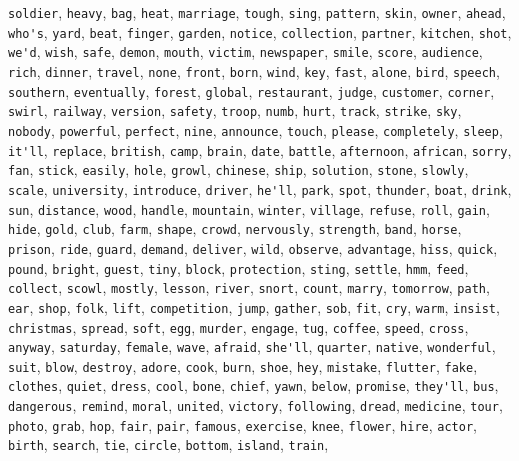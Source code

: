 \verb|soldier|, \verb|heavy|, \verb|bag|, \verb|heat|, \verb|marriage|, \verb|tough|, \verb|sing|, \verb|pattern|, \verb|skin|, \verb|owner|, \verb|ahead|, \verb|who's|, \verb|yard|, \verb|beat|, \verb|finger|, \verb|garden|, \verb|notice|, \verb|collection|, \verb|partner|, \verb|kitchen|, \verb|shot|, \verb|we'd|, \verb|wish|, \verb|safe|, \verb|demon|, \verb|mouth|, \verb|victim|, \verb|newspaper|, \verb|smile|, \verb|score|, \verb|audience|, \verb|rich|, \verb|dinner|, \verb|travel|, \verb|none|, \verb|front|, \verb|born|, \verb|wind|, \verb|key|, \verb|fast|, \verb|alone|, \verb|bird|, \verb|speech|, \verb|southern|, \verb|eventually|, \verb|forest|, \verb|global|, \verb|restaurant|, \verb|judge|, \verb|customer|, \verb|corner|, \verb|swirl|, \verb|railway|, \verb|version|, \verb|safety|, \verb|troop|, \verb|numb|, \verb|hurt|, \verb|track|, \verb|strike|, \verb|sky|, \verb|nobody|, \verb|powerful|, \verb|perfect|, \verb|nine|, \verb|announce|, \verb|touch|, \verb|please|, \verb|completely|, \verb|sleep|, \verb|it'll|, \verb|replace|, \verb|british|, \verb|camp|, \verb|brain|, \verb|date|, \verb|battle|, \verb|afternoon|, \verb|african|, \verb|sorry|, \verb|fan|, \verb|stick|, \verb|easily|, \verb|hole|, \verb|growl|, \verb|chinese|, \verb|ship|, \verb|solution|, \verb|stone|, \verb|slowly|, \verb|scale|, \verb|university|, \verb|introduce|, \verb|driver|, \verb|he'll|, \verb|park|, \verb|spot|, \verb|thunder|, \verb|boat|, \verb|drink|, \verb|sun|, \verb|distance|, \verb|wood|, \verb|handle|, \verb|mountain|, \verb|winter|, \verb|village|, \verb|refuse|, \verb|roll|, \verb|gain|, \verb|hide|, \verb|gold|, \verb|club|, \verb|farm|, \verb|shape|, \verb|crowd|, \verb|nervously|, \verb|strength|, \verb|band|, \verb|horse|, \verb|prison|, \verb|ride|, \verb|guard|, \verb|demand|, \verb|deliver|, \verb|wild|, \verb|observe|, \verb|advantage|, \verb|hiss|, \verb|quick|, \verb|pound|, \verb|bright|, \verb|guest|, \verb|tiny|, \verb|block|, \verb|protection|, \verb|sting|, \verb|settle|, \verb|hmm|, \verb|feed|, \verb|collect|, \verb|scowl|, \verb|mostly|, \verb|lesson|, \verb|river|, \verb|snort|, \verb|count|, \verb|marry|, \verb|tomorrow|, \verb|path|, \verb|ear|, \verb|shop|, \verb|folk|, \verb|lift|, \verb|competition|, \verb|jump|, \verb|gather|, \verb|sob|, \verb|fit|, \verb|cry|, \verb|warm|, \verb|insist|, \verb|christmas|, \verb|spread|, \verb|soft|, \verb|egg|, \verb|murder|, \verb|engage|, \verb|tug|, \verb|coffee|, \verb|speed|, \verb|cross|, \verb|anyway|, \verb|saturday|, \verb|female|, \verb|wave|, \verb|afraid|, \verb|she'll|, \verb|quarter|, \verb|native|, \verb|wonderful|, \verb|suit|, \verb|blow|, \verb|destroy|, \verb|adore|, \verb|cook|, \verb|burn|, \verb|shoe|, \verb|hey|, \verb|mistake|, \verb|flutter|, \verb|fake|, \verb|clothes|, \verb|quiet|, \verb|dress|, \verb|cool|, \verb|bone|, \verb|chief|, \verb|yawn|, \verb|below|, \verb|promise|, \verb|they'll|, \verb|bus|, \verb|dangerous|, \verb|remind|, \verb|moral|, \verb|united|, \verb|victory|, \verb|following|, \verb|dread|, \verb|medicine|, \verb|tour|, \verb|photo|, \verb|grab|, \verb|hop|, \verb|fair|, \verb|pair|, \verb|famous|, \verb|exercise|, \verb|knee|, \verb|flower|, \verb|hire|, \verb|actor|, \verb|birth|, \verb|search|, \verb|tie|, \verb|circle|, \verb|bottom|, \verb|island|, \verb|train|, 